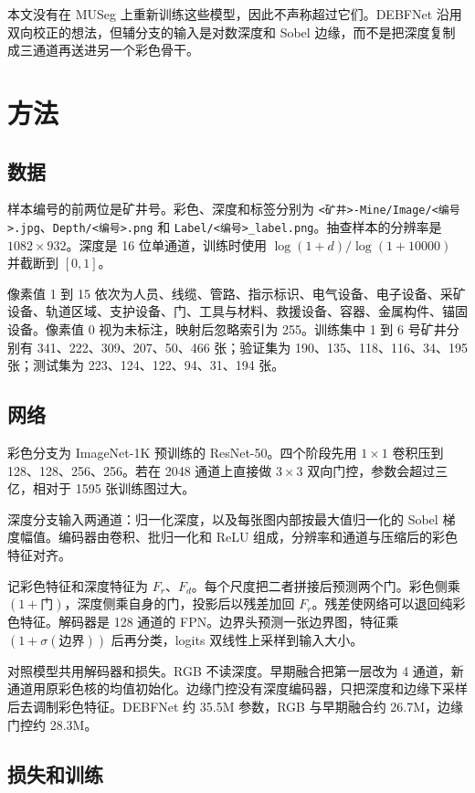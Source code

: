 \documentclass[11pt]{article}
\begin{document}
本文没有在 MUSeg 上重新训练这些模型，因此不声称超过它们。DEBFNet 沿用双向校正的想法，但辅分支的输入是对数深度和 Sobel 边缘，而不是把深度复制成三通道再送进另一个彩色骨干。

\section{方法}

\subsection{数据}

样本编号的前两位是矿井号。彩色、深度和标签分别为 \texttt{<矿井>-Mine/Image/<编号>.jpg}、\texttt{Depth/<编号>.png} 和 \texttt{Label/<编号>\_label.png}。抽查样本的分辨率是 $1082\times932$。深度是 16 位单通道，训练时使用 $\log(1+d)/\log(1+10000)$ 并截断到 $[0,1]$。

像素值 1 到 15 依次为人员、线缆、管路、指示标识、电气设备、电子设备、采矿设备、轨道区域、支护设备、门、工具与材料、救援设备、容器、金属构件、锚固设备。像素值 0 视为未标注，映射后忽略索引为 255。训练集中 1 到 6 号矿井分别有 341、222、309、207、50、466 张；验证集为 190、135、118、116、34、195 张；测试集为 223、124、122、94、31、194 张。

\subsection{网络}

彩色分支为 ImageNet-1K 预训练的 ResNet-50。四个阶段先用 $1\times1$ 卷积压到 128、128、256、256。若在 2048 通道上直接做 $3\times3$ 双向门控，参数会超过三亿，相对于 1595 张训练图过大。

深度分支输入两通道：归一化深度，以及每张图内部按最大值归一化的 Sobel 梯度幅值。编码器由卷积、批归一化和 ReLU 组成，分辨率和通道与压缩后的彩色特征对齐。

记彩色特征和深度特征为 $F_r$、$F_d$。每个尺度把二者拼接后预测两个门。彩色侧乘 $(1+\text{门})$，深度侧乘自身的门，投影后以残差加回 $F_r$。残差使网络可以退回纯彩色特征。解码器是 128 通道的 FPN。边界头预测一张边界图，特征乘 $(1+\sigma(\text{边界}))$ 后再分类，logits 双线性上采样到输入大小。

对照模型共用解码器和损失。RGB 不读深度。早期融合把第一层改为 4 通道，新通道用原彩色核的均值初始化。边缘门控没有深度编码器，只把深度和边缘下采样后去调制彩色特征。DEBFNet 约 35.5M 参数，RGB 与早期融合约 26.7M，边缘门控约 28.3M。

\subsection{损失和训练}
\end{document}
